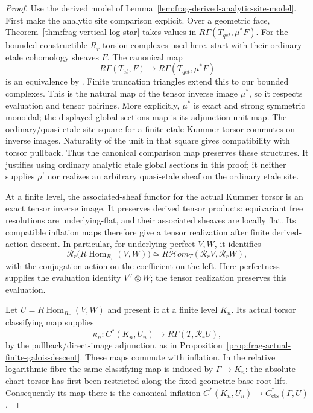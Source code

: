 \documentclass[11pt]{article}
\theoremstyle{definition}
\theoremstyle{remark}
\begin{document}
\begin{proof}
Use the derived model of Lemma~\ref{lem:frag-derived-analytic-site-model}.
First make the analytic site comparison explicit.  Over a geometric
face, Theorem~\ref{thm:frag-vertical-log-star} takes values in
$R\Gamma(T_{q\acute et},\mu^*F)$.  For the bounded constructible $R_r$-torsion complexes used here,
start with their ordinary etale cohomology sheaves $F$.  The canonical map
\[
 R\Gamma(T_{\acute et},F)\longrightarrow
 R\Gamma(T_{q\acute et},\mu^*F)
\]
is an equivalence by
\cite[Theorem 3.3(i)--(ii), with $U=X=T$]{BerkovichFormalI}.
Finite truncation triangles extend this to our bounded complexes.
This is the natural map of the tensor inverse image $\mu^*$, so it
respects evaluation and tensor pairings.  More explicitly, $\mu^*$
is exact and strong symmetric monoidal; the displayed global-sections
map is its adjunction-unit map.  The ordinary/quasi-etale site square
for a finite etale Kummer torsor commutes on inverse images.
Naturality of the unit in that square gives compatibility with
torsor pullback.  Thus the canonical comparison map preserves these structures.  It justifies
using ordinary analytic etale global sections in this proof; it
neither supplies $\mu^!$ nor realizes an arbitrary quasi-etale sheaf
on the ordinary etale site.

At a finite level, the associated-sheaf functor for the actual Kummer
torsor is an exact tensor inverse image.  It preserves derived tensor
products: equivariant free resolutions are underlying-flat, and their
associated sheaves are locally flat.  Its compatible inflation maps
therefore give a tensor realization after finite derived-action
descent.  In particular, for underlying-perfect $V,W$, it identifies
\[
 \mathcal R_r\bigl(R\operatorname{Hom}_{R_r}(V,W)\bigr)
 \simeq R\mathcal Hom_{T}(\mathcal R_rV,\mathcal R_rW),
\]
with the conjugation action on the coefficient on the left.
Here perfectness supplies the evaluation identity $V^\vee\otimes W$;
the tensor realization preserves this evaluation.

Let $U=R\operatorname{Hom}_{R_r}(V,W)$ and present it at a finite
level $K_n$.  Its actual torsor classifying map supplies
\[
 \kappa_n:C^*(K_n,U_n)\longrightarrow R\Gamma(T,\mathcal R_rU),
\]
by the pullback/direct-image adjunction, as in
Proposition~\ref{prop:frag-actual-finite-galois-descent}.
These maps commute with inflation.  In the relative logarithmic
fibre the same classifying map is induced by $\Gamma\to K_n$:
the absolute chart torsor has first been restricted along the fixed
geometric base-root lift.  Consequently its map there is the
canonical inflation
$C^*(K_n,U_n)\to C^*_{\mathrm{cts}}(\Gamma,U)$.


\end{proof}
\end{document}
